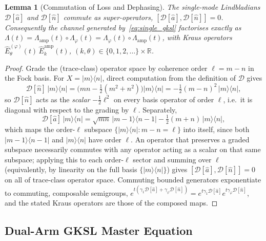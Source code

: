 \documentclass[journal]{IEEEtran}
\newtheorem{lemma}{Lemma}
\begin{document}
\begin{lemma}[Commutation of Loss and Dephasing]\label{lem:commute}
The single-mode Lindbladians $\mathcal D[\hat a]$ and $\mathcal D[\hat n]$ commute as super-operators, $[\mathcal D[\hat a],\mathcal D[\hat n]]=0$. Consequently the channel generated by~\eqref{eq:single_gksl} factorises \emph{exactly} as $\Lambda(t)=\Lambda_{\text{amp}}(t)\circ\Lambda_\varphi(t)=\Lambda_\varphi(t)\circ\Lambda_{\text{amp}}(t)$, with Kraus operators $\hat E_\theta^{(\varphi)}(t)\,\hat E_k^{\text{amp}}(t)$, $(k,\theta)\in\{0,1,2,\dots\}\times\mathbb R$.
\end{lemma}
\begin{proof}
Grade the (trace-class) operator space by coherence order $\ell=m-n$ in the Fock basis. For $X=|m\rangle\langle n|$, direct computation from the definition of $\mathcal D$ gives
\[
\mathcal D[\hat n]\,|m\rangle\langle n| = \big(mn-\tfrac12(m^2+n^2)\big)|m\rangle\langle n| = -\tfrac12(m-n)^2\,|m\rangle\langle n|,
\]
so $\mathcal D[\hat n]$ acts as the \emph{scalar} $-\tfrac12\ell^2$ on every basis operator of order $\ell$, i.e.\ it is diagonal with respect to the grading by $\ell$. Separately,
\[
\mathcal D[\hat a]\,|m\rangle\langle n| = \sqrt{mn}\,|m-1\rangle\langle n-1| - \tfrac12(m+n)\,|m\rangle\langle n|,
\]
which maps the order-$\ell$ subspace $\{|m\rangle\langle n|:m-n=\ell\}$ into itself, since both $|m-1\rangle\langle n-1|$ and $|m\rangle\langle n|$ have order $\ell$. An operator that preserves a graded subspace necessarily commutes with any operator acting as a scalar on that same subspace; applying this to each order-$\ell$ sector and summing over $\ell$ (equivalently, by linearity on the full basis $\{|m\rangle\langle n|\}$) gives $[\mathcal D[\hat a],\mathcal D[\hat n]]=0$ on all of trace-class operator space. Commuting bounded generators exponentiate to commuting, composable semigroups, $e^{t(\gamma_1\mathcal D[\hat a]+\gamma_\varphi\mathcal D[\hat n])}=e^{t\gamma_1\mathcal D[\hat a]}e^{t\gamma_\varphi\mathcal D[\hat n]}$, and the stated Kraus operators are those of the composed maps.
\end{proof}

\subsection{Dual-Arm GKSL Master Equation}
\end{document}
